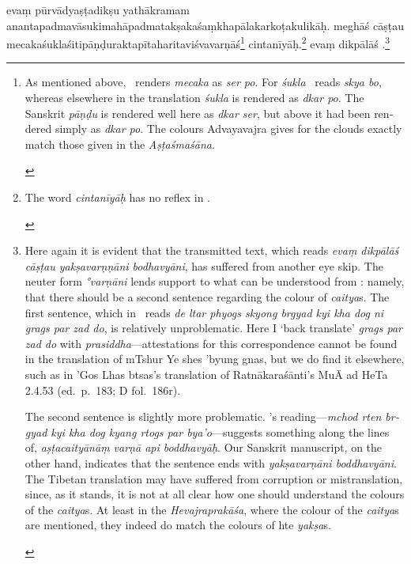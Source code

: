 \documentclass[naipra.tex]{subfiles}
\begin{document}
\begin{sanskrit}
\pstart
evaṃ pūrvādyaṣṭadikṣu yathākramam ananta\dsh padma\dsh vāsuki\dsh mahāpadma\dsh takṣaka\dsh śaṃkhapāla\dsh karkoṭa\dsh kulikāḥ.
meghāś cāṣṭau mecaka\dsh śukla\dsh śiti\dsh pāṇḍu\dsh rakta\dsh pīta\dsh harita\dsh viśvavarṇāś\footnote{
	\begin{english}%
		As mentioned above, \TIB\ renders \emph{mecaka} as \emph{ser po}.
		For \emph{śukla} \TIB\ reads \emph{skya bo}, whereas elsewhere in the translation \emph{śukla} is rendered as \emph{dkar po}.
		The Sanskrit \emph{pāṇḍu} is rendered well here as \emph{dkar ser}, but above it had been rendered simply as \emph{dkar po}.
		The colours Advayavajra gives for the clouds exactly match those given in the \emph{Aṣṭaśmaśāna}.
	\end{english}
} cintanīyāḥ.\footnote{
	\begin{english}%
		The word \emph{cintanīyāḥ} has no reflex in \TIB .
	\end{english}
}
evaṃ dikpālāś  .\footnote{
	\begin{english}%
		Here again it is evident that the transmitted text, which reads \emph{evaṃ dikpālāś cāṣṭau yakṣavarṇṇāni bodhavyāni}, has suffered from another eye skip.
		The neuter form \emph{°varṇāni} lends support to what can be understood from \TIB : namely, that there should be a second sentence regarding the colour of \emph{caitya}s.
		The first sentence, which in \TIB\ reads \emph{de ltar phyogs skyong brgyad kyi kha dog ni grags par zad do}, is relatively unproblematic.
		Here I `back translate' \emph{grags par zad do} with \emph{prasiddha}—attestations for this correspondence cannot be found in the translation of mTshur Ye shes 'byung gnas, but we do find it elsewhere, such as in 'Gos Lhas btsas's translation of Ratnākaraśānti's MuĀ ad HeTa 2.4.53 (ed.\ p.\ 183; D fol.\ 186r).

		The second sentence is slightly more problematic.
		\TIB 's reading—\emph{mchod rten brgyad kyi kha dog kyang rtogs par bya'o}—suggests something along the lines of, \emph{aṣṭacaityānāṃ varṇā api boddhavyāḥ}.
		Our Sanskrit manuscript, on the other hand, indicates that the sentence ends with \emph{yakṣavarṇāni boddhavyāni}.
		The Tibetan translation may have suffered from corruption or mistranslation, since, as it stands, it is not at all clear how one should understand the colours of the \emph{caitya}s.
		At least in the \emph{Hevajraprakāśa}, where the colour of the \emph{caitya}s are mentioned, they indeed do match the colours of hte \emph{yakṣa}s.
	\end{english}
}
\pend


\end{sanskrit}
\end{document}
